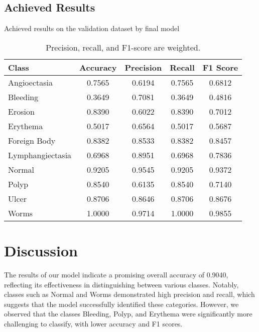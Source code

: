 \documentclass[12pt]{article}
\begin{document}
\subsection{Achieved Results}
\begin{table}[htbp]
    \centering
    \caption{Achieved results on the validation dataset by final model}
    \begin{tabular}{|l|c|c|c|c|}
        \hline
        \textbf{Class} & \textbf{Accuracy} & \textbf{Precision} & \textbf{Recall} & \textbf{F1 Score} \\ 
        \hline
        Angioectasia & 0.7565 & 0.6194 & 0.7565 & 0.6812 \\ 
        \hline
        Bleeding & 0.3649 & 0.7081 & 0.3649 & 0.4816 \\ 
        \hline
        Erosion & 0.8390 & 0.6022 & 0.8390 & 0.7012 \\ 
        \hline
        Erythema & 0.5017 & 0.6564 & 0.5017 & 0.5687 \\ 
        \hline
        Foreign Body & 0.8382 & 0.8533 & 0.8382 & 0.8457 \\ 
        \hline
        Lymphangiectasia & 0.6968 & 0.8951 & 0.6968 & 0.7836 \\ 
        \hline
        Normal & 0.9205 & 0.9545 & 0.9205 & 0.9372 \\ 
        \hline
        Polyp & 0.8540 & 0.6135 & 0.8540 & 0.7140 \\ 
        \hline
        Ulcer & 0.8706 & 0.8646 & 0.8706 & 0.8676 \\ 
        \hline
        Worms & 1.0000 & 0.9714 & 1.0000 & 0.9855 \\ 
        \hline
    \end{tabular}
    \caption{Precision, recall, and F1-score are weighted.}
\end{table}

\section{Discussion}\label{sec4}

The results of our model indicate a promising overall accuracy of 0.9040, reflecting its effectiveness in distinguishing between various classes. Notably, classes such as Normal and Worms demonstrated high precision and recall, which suggests that the model successfully identified these categories. However, we observed that the classes Bleeding, Polyp, and Erythema were significantly more challenging to classify, with lower accuracy and F1 scores. 
\end{document}
